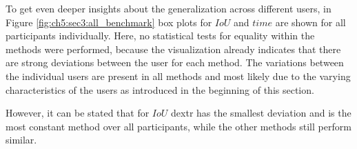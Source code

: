 To get even deeper insights about the generalization across different users, in Figure \ref{fig:ch5:sec3:all_benchmark} box plots for $ IoU $ and $ time $ are shown for all participants individually.
Here, no statistical tests for equality within the methods were performed, because the visualization already indicates that there are strong deviations between the user for each method.
The variations between the individual users are present in all methods and most likely due to the varying characteristics of the users as introduced in the beginning of this section.

However, it can be stated that for $ IoU $ \gls{dextr} has the smallest deviation and is the most constant method over all participants, while the other methods still perform similar.

